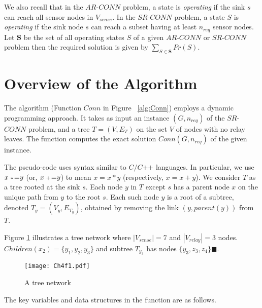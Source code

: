 We also recall that in the $AR$-$CONN$ problem, a state is {\em operating} if the sink $s$
can reach all sensor nodes in $V_{sense}$.
%
In the $SR$-$CONN$ problem, a state $S$ is {\em operating} if
the sink node $s$ can reach a subset having at least $n_{req}$ sensor nodes.
%
Let $\textbf{S}$ be the set of all operating states $S$ of a given
$AR$-$CONN$ or $SR$-$CONN$ problem then the required solution is given by $\sum_{S \in \textbf{S}} Pr(S)$.
\section{Overview of the Algorithm}
The algorithm (Function $Conn$ in Figure ~\ref{alg:Conn}) employs a
dynamic programming approach.
%
It takes as input an instance $(G,n_{req})$ of the $SR$-$CONN$ problem,
and a tree $T=(V,E_T)$ on the set $V$ of nodes with no relay leaves.
%
The function computes the exact solution $Conn(G,n_{req})$ of the given
instance.

The pseudo-code uses syntax similar to $C/C\mbox{++}$ languages. In particular, we use $x {\;{\scriptstyle *} \! =} y$ (or, $x {\;{\scriptstyle +} \! =} y$) to mean $x=x*y$ (respectively, $x=x+y$).
We consider $T$ as a tree rooted at the sink $s$. Each node $y$ in $T$ except $s$ has a parent node $x$ on the unique path from $y$ to the root $s$.
%
Each such node $y$ is a root of a subtree, denoted $T_y=(V_y,E_{T_y})$, obtained by
removing the link $(y, parent(y))$ from $T$.

\begin{example}
\normalfont
Figure \ref{fig:es31} illustrates a tree network where $|V_{sense}|=7$ and $|V_{relay}|=3$ nodes. $Children(x_2)=\{y_1,y_2,y_3\}$ and subtree $T_{y_3}$ has nodes $\{y_3,z_3,z_4\} \blacksquare$.
\end{example}
\begin{figure}[!htb]
\centering
\texttt{[image: Ch4f1.pdf]}
 \caption{ A tree network}
\label{fig:es31}
\end{figure}

The key variables and data structures in the function are as follows.

